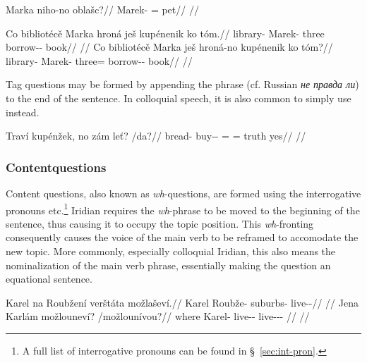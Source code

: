 \pex
\begingl
\gla Marka niho-no oblašc?//
\glb Marek-\Acc{} \N{}\Exst{}=\Q{} pet//
\glft {}//
\endgl
\xe

\pex
\a
\begingl
\gla Co bibliotécě Marka hroná ješ kupénenik ko tóm.//
\glb \Abl{} library-\Gen{} Marek-\Acc{} three \Exst{} borrow-\Pv{}-\Pf{} \Lnk{} book//
\glft {}//
\endgl
\a
\begingl
\gla Co bibliotécě Marka ješ hroná-no kupénenik ko tóm?//
\glb \Abl{} library-\Gen{} Marek-\Acc{} \Exst{} three=\Q{} borrow-\Pv{}-\Pf{} \Lnk{} book//
\glft {}//
\endgl
\xe

Tag questions may be formed by appending the phrase  (cf. Russian \textit{\cyrtext не
правда ли}) to the end of the sentence. In colloquial speech, it is also common
to simply use  instead.

\pex
\begingl
\gla Traví kupénžek, no zám leť? /da?//
\glb bread-\Gen{} buy-\Av{}-\Pf{} \Q{}= \Neg{}= truth yes//
\glft {}//
\endgl
\xe

\subsubsection{Contentquestions}\label{sec:content-questions}

Content questions, also known as \emph{wh}-questions, are formed using the
interrogative pronouns   
etc.\footnote{ A full list of interrogative pronouns can be found in
\S~\ref{sec:int-pron}. } Iridian requires the \emph{wh}-phrase to be moved to
the beginning of the sentence, thus causing it to occupy the topic position.
This \emph{wh}-fronting consequently
causes the voice of the main verb to be reframed to accomodate the new topic.
More commonly, especially colloquial Iridian, this
also means the nominalization of the main verb phrase,
essentially making the question an equational sentence.

\pex
\a\begingl
\gla Karel na Roubžení verštáta možlaševí.//
\glb Karel \Loc{} Roubže-\Gen{} suburbs-\Acc{} live-\Av{}-\Cont{}//
\glft {}//
\endgl
\a\begingl
\gla Jena Karlám možlouneví? /možlounívou?//
\glb where Karel-\Agt{} live-\Lv{}-\Cont{} live-\Lv{}-\Cont{}-\Nz{} //
\glft {}//
\endgl
\xe

